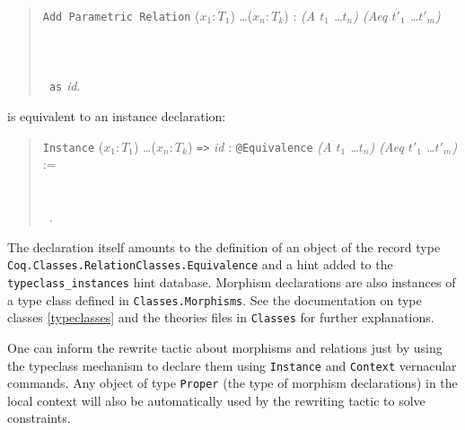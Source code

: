 \begin{quote}
  \texttt{Add Parametric Relation} ($x_1 : T_1$) \ldots ($x_n : T_k$) :
  \textit{(A $t_1$ \ldots $t_n$) (Aeq $t'_1$ \ldots $t'_m$)}\\
  ~\\
  ~\\
  ~\\
  \texttt{~as} \textit{id}.
\end{quote}

is equivalent to an instance declaration:

\begin{quote}
  \texttt{Instance} ($x_1 : T_1$) \ldots ($x_n : T_k$) \texttt{=>}
  \textit{id} : \texttt{@Equivalence} \textit{(A $t_1$ \ldots $t_n$) (Aeq
    $t'_1$ \ldots $t'_m$)} :=\\
  ~\\
  ~\\
  ~.
\end{quote}

The declaration itself amounts to the definition of an object of the
record type \texttt{Coq.Classes.RelationClasses.Equivalence} and a
hint added to the \texttt{typeclass\_instances} hint database. 
Morphism declarations are also instances of a type class defined in
\texttt{Classes.Morphisms}.
See the documentation on type classes \ref{typeclasses} and 
the theories files in \texttt{Classes} for further explanations. 

One can inform the rewrite tactic about morphisms and relations just by
using the typeclass mechanism to declare them using \texttt{Instance}
and \texttt{Context} vernacular commands.
Any object of type \texttt{Proper} (the type of morphism declarations)
in the local context will also be automatically used by the rewriting 
tactic to solve constraints.

